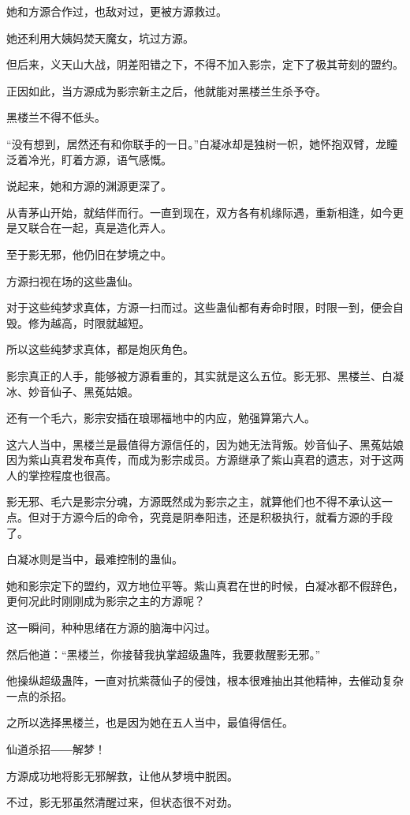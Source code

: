 \begin{this_body}
她和方源合作过，也敌对过，更被方源救过。

她还利用大姨妈焚天魔女，坑过方源。

但后来，义天山大战，阴差阳错之下，不得不加入影宗，定下了极其苛刻的盟约。

正因如此，当方源成为影宗新主之后，他就能对黑楼兰生杀予夺。

黑楼兰不得不低头。

“没有想到，居然还有和你联手的一日。”白凝冰却是独树一帜，她怀抱双臂，龙瞳泛着冷光，盯着方源，语气感慨。

说起来，她和方源的渊源更深了。

从青茅山开始，就结伴而行。一直到现在，双方各有机缘际遇，重新相逢，如今更是又联合在一起，真是造化弄人。

至于影无邪，他仍旧在梦境之中。

方源扫视在场的这些蛊仙。

对于这些纯梦求真体，方源一扫而过。这些蛊仙都有寿命时限，时限一到，便会自毁。修为越高，时限就越短。

所以这些纯梦求真体，都是炮灰角色。

影宗真正的人手，能够被方源看重的，其实就是这么五位。影无邪、黑楼兰、白凝冰、妙音仙子、黑菟姑娘。

还有一个毛六，影宗安插在琅琊福地中的内应，勉强算第六人。

这六人当中，黑楼兰是最值得方源信任的，因为她无法背叛。妙音仙子、黑菟姑娘因为紫山真君发布真传，而成为影宗成员。方源继承了紫山真君的遗志，对于这两人的掌控程度也很高。

影无邪、毛六是影宗分魂，方源既然成为影宗之主，就算他们也不得不承认这一点。但对于方源今后的命令，究竟是阴奉阳违，还是积极执行，就看方源的手段了。

白凝冰则是当中，最难控制的蛊仙。

她和影宗定下的盟约，双方地位平等。紫山真君在世的时候，白凝冰都不假辞色，更何况此时刚刚成为影宗之主的方源呢？

这一瞬间，种种思绪在方源的脑海中闪过。

然后他道：“黑楼兰，你接替我执掌超级蛊阵，我要救醒影无邪。”

他操纵超级蛊阵，一直对抗紫薇仙子的侵蚀，根本很难抽出其他精神，去催动复杂一点的杀招。

之所以选择黑楼兰，也是因为她在五人当中，最值得信任。

仙道杀招――解梦！

方源成功地将影无邪解救，让他从梦境中脱困。

不过，影无邪虽然清醒过来，但状态很不对劲。


\end{this_body}
